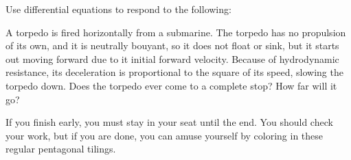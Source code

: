 \documentclass[addpoints,12pt]{exam}
\begin{document}
\begin{questions}

 
 \newpage
 
 \question[2] Use differential equations to respond to the following:
 
  A torpedo is fired horizontally from a submarine. The torpedo has no propulsion of its own, and it is neutrally bouyant, so it does not float or sink, but it starts out moving forward due to it initial forward velocity. Because of hydrodynamic resistance, {its deceleration is proportional to the square of its speed}, slowing the torpedo down. Does the torpedo ever come to a complete stop? How far will it go? 

  
 

 
 
\end{questions}

\newpage

If you finish early, you must stay in your seat until the end. You should check your work, but if you are done, you can amuse yourself by coloring in these regular pentagonal tilings.
\end{document}
